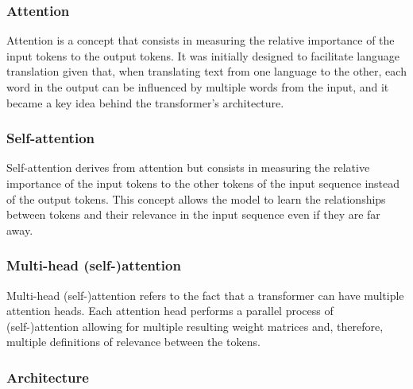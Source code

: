 \subsubsection{Attention}

Attention is a concept that consists in measuring the relative importance of the input tokens to the output tokens. It was initially designed to facilitate language translation given that, when translating text from one language to the other, each word in the output can be influenced by multiple words from the input, and it became a key idea behind the transformer's architecture.

\subsubsection{Self-attention}

Self-attention derives from attention but consists in measuring the relative importance of the input tokens to the other tokens of the input sequence instead of the output tokens. This concept allows the model to learn the relationships between tokens and their relevance in the input sequence even if they are far away.
 
\subsubsection{Multi-head (self-)attention}

Multi-head (self-)attention refers to the fact that a transformer can have multiple attention heads. Each attention head performs a parallel process of (self-)attention allowing for multiple resulting weight matrices and, therefore, multiple definitions of relevance between the tokens.

\subsubsection{Architecture}

